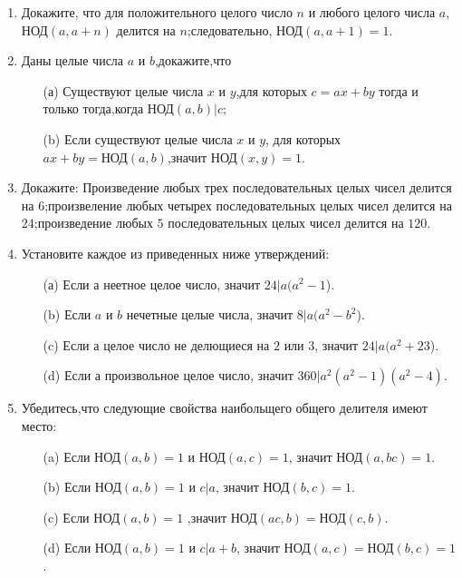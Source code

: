 \documentclass[11pt]{article}
\begin{document}
\begin{enumerate}
\item Докажите, что для положительного целого число $n$ и любого целого числа $a$, $\text{НОД}(a,a+n)$ делится на $n$;следовательно, $\text{НОД}(a,a+1)=1$.

\item Даны целые числа $a$ и $b$,докажите,что
\begin{enumerate}
	\item[(а)] Существуют целые числа $x$ и $y$,для которых $c=ax+by$ тогда и только тогда,когда $\text{НОД}(a,b)|c$;
	\item[(b)] Если существуют целые числа $x$ и $y$, для которых $ax+by=\text{НОД}(a,b)$,значит $\text{НОД}(x,y)=1$.
\end{enumerate}
\item Докажите: Произведение любых трех последовательных целых чисел делится на $6$;произвеление любых четырех последовательных целых чисел делится на $24$;произведение любых $5$ последовательных целых чисел делится на $120$.
\item Установите каждое из приведенных ниже утверждений:
\begin{enumerate}
	\item[(а)] Если а неетное целое число, значит $24|a(a^{2}-1$).
	\item[(b)] Если $a$ и $b$ нечетные целые числа, значит $8|a(a^{2}-b^{2}$).
	\item[(c)] Если $а$ целое число не делющиеся на $2$ или $3$, значит $24|a(a^{2}+23$).
	\item[(d)] Если $а$ произвольное целое число, значит $360|a^{2}(a^{2}-1)(a^{2}-4)$.
\end{enumerate}

\item Убедитесь,что следующие свойства наибольщего общего делителя имеют место:
\begin{enumerate}
	\item[(a)] Если $\text{НОД}(a,b)=1$ и $\text{НОД}(a,c)=1$, значит $\text{НОД}(a,bc)=1$.
	\item[(b)] Если $\text{НОД}(a,b)=1$ и $c|a$, значит $\text{НОД}(b,c)=1$.
	\item[(c)] Если $\text{НОД}(a,b)=1$ ,значит $\text{НОД}(ac,b)=\text{НОД}(c,b)$.
	\item[(d)] Если $\text{НОД}(a,b)=1$ и $c|a+b$, значит $\text{НОД}(a,c)=\text{НОД}(b,c)=1$.
\end{enumerate}

\end{enumerate}
\end{document}
